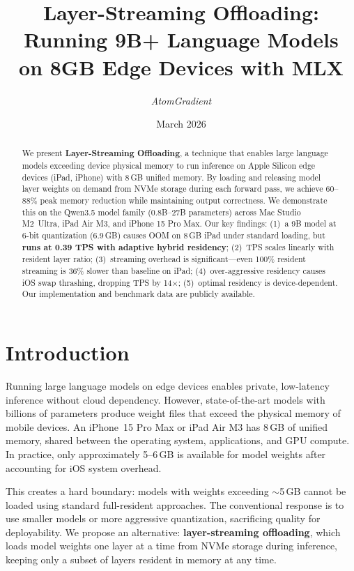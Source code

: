 \documentclass[10pt,a4paper]{article}
\title{\textbf{Layer-Streaming Offloading: Running 9B+ Language Models\\on 8GB Edge Devices with MLX}}
\author{\textit{AtomGradient}}
\date{March 2026}
\begin{document}
\maketitle

\begin{abstract}
We present \textbf{Layer-Streaming Offloading}, a technique that enables large language models exceeding device physical memory to run inference on Apple Silicon edge devices (iPad, iPhone) with 8\,GB unified memory. By loading and releasing model layer weights on demand from NVMe storage during each forward pass, we achieve 60--88\% peak memory reduction while maintaining output correctness. We demonstrate this on the Qwen3.5 model family (0.8B--27B parameters) across Mac Studio M2~Ultra, iPad Air M3, and iPhone 15 Pro Max. Our key findings: (1)~a 9B model at 6-bit quantization (6.9\,GB) causes OOM on 8\,GB iPad under standard loading, but \textbf{runs at 0.39 TPS with adaptive hybrid residency}; (2)~TPS scales linearly with resident layer ratio; (3)~streaming overhead is significant---even 100\% resident streaming is 36\% slower than baseline on iPad; (4)~over-aggressive residency causes iOS swap thrashing, dropping TPS by 14$\times$; (5)~optimal residency is device-dependent. Our implementation and benchmark data are publicly available.
\end{abstract}

\section{Introduction}

Running large language models on edge devices enables private, low-latency inference without cloud dependency. However, state-of-the-art models with billions of parameters produce weight files that exceed the physical memory of mobile devices. An iPhone~15 Pro Max or iPad Air M3 has 8\,GB of unified memory, shared between the operating system, applications, and GPU compute. In practice, only approximately 5--6\,GB is available for model weights after accounting for iOS system overhead.

This creates a hard boundary: models with weights exceeding $\sim$5\,GB cannot be loaded using standard full-resident approaches. The conventional response is to use smaller models or more aggressive quantization, sacrificing quality for deployability. We propose an alternative: \textbf{layer-streaming offloading}, which loads model weights one layer at a time from NVMe storage during inference, keeping only a subset of layers resident in memory at any time.
\end{document}
